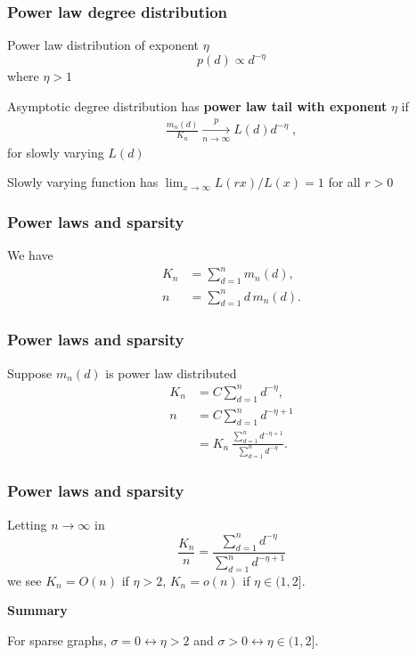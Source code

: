 \documentclass[final,hyperref={pdfpagelabels=false},noamsthm]{beamer}
\begin{document}
\begin{frame}
	\frametitle{Power law degree distribution}
	Power law distribution of exponent $\eta$\
	\begin{equation*}
	p(d) \propto d^{-\eta} 
	\end{equation*}
	where $\eta > 1$
	
	\pause
	Asymptotic degree distribution has \textbf{power law tail with exponent} $\eta$ if
	\begin{align} 
	\label{eq:plaw}
	\frac{m_{n}(d)}{K_n} \xrightarrow[n\to\infty]{p} L(d)d^{-\eta} \;,
	\end{align}
	for slowly varying $L(d)$
	
	\vspace{20pt}
	\pause
	\small{Slowly varying function has ${\lim_{x\to\infty} L(rx)/L(x) = 1}$ for all ${r>0}$ \cite{bingham1989}}
\end{frame}

\begin{frame}
	\frametitle{Power laws and sparsity}
	We have
	\begin{align*}
		K_n &= \sum_{d=1}^n m_n(d), \\
		n &= \sum_{d=1}^n d\, m_n(d).
	\end{align*}
\end{frame}

\begin{frame}
	\frametitle{Power laws and sparsity}
	Suppose $m_n(d)$ is power law distributed
	\begin{align*}
	K_n &= C \sum_{d=1}^n d^{-\eta}, \\
	n &= C \sum_{d=1}^n d^{-\eta + 1} \\
	&= K_n \, \frac{\sum_{d=1}^n d^{-\eta + 1}}{\sum_{d=1}^n d^{-\eta}}.
	\end{align*}
\end{frame}

\begin{frame}
	\frametitle{Power laws and sparsity}
	Letting $n\to \infty$ in
	\begin{equation*}
		\frac{K_n}{n} = \frac{\sum_{d=1}^n d^{-\eta}}{\sum_{d=1}^n d^{-\eta + 1}}
	\end{equation*}
	we see $K_n = O(n)$ if $\eta > 2$, $K_n = o(n)$ if $\eta \in (1, 2]$.
	\vspace{40pt}
	\pause
	
	\textbf{Summary}
	
	For sparse graphs, $\sigma=0 \leftrightarrow \eta > 2$ and $\sigma > 0 \leftrightarrow \eta \in (1,2]$.
\end{frame}
\end{document}
